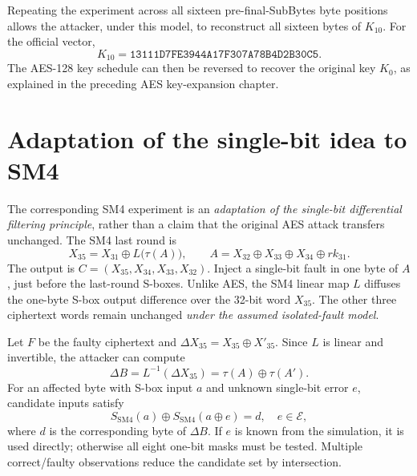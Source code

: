 \documentclass[11pt,a4paper]{report}
\newcommand{\hex}[1]{\texttt{#1}}
\newcommand{\xor}{\mathbin{\oplus}}
\begin{document}
Repeating the experiment across all sixteen pre-final-SubBytes byte positions allows the attacker, under this model, to reconstruct all sixteen bytes of $K_{10}$. For the official vector,
\begin{equation}
K_{10}=\hex{13111D7FE3944A17F307A78B4D2B30C5}.
\end{equation}
The AES-128 key schedule can then be reversed to recover the original key $K_0$, as explained in the preceding AES key-expansion chapter.

\section{Adaptation of the single-bit idea to SM4}
\label{sec:giraud_sm4}
The corresponding SM4 experiment is an \emph{adaptation of the single-bit differential filtering principle}, rather than a claim that the original AES attack transfers unchanged. The SM4 last round is
\begin{equation}
X_{35}=X_{31}\xor L\bigl(\tau(A)\bigr),\qquad A=X_{32}\xor X_{33}\xor X_{34}\xor rk_{31}.
\end{equation}
The output is $C=(X_{35},X_{34},X_{33},X_{32})$. Inject a single-bit fault in one byte of $A$, just before the last-round S-boxes. Unlike AES, the SM4 linear map $L$ diffuses the one-byte S-box output difference over the 32-bit word $X_{35}$. The other three ciphertext words remain unchanged \emph{under the assumed isolated-fault model}.

Let $F$ be the faulty ciphertext and $\Delta X_{35}=X_{35}\xor X'_{35}$. Since $L$ is linear and invertible, the attacker can compute
\begin{equation}
\Delta B=L^{-1}(\Delta X_{35})=\tau(A)\xor\tau(A').
\end{equation}
For an affected byte with S-box input $a$ and unknown single-bit error $e$, candidate inputs satisfy
\begin{equation}
S_{\mathrm{SM4}}(a)\xor S_{\mathrm{SM4}}(a\xor e)=d,
\quad e\in\mathcal E,
\end{equation}
where $d$ is the corresponding byte of $\Delta B$. If $e$ is known from the simulation, it is used directly; otherwise all eight one-bit masks must be tested. Multiple correct/faulty observations reduce the candidate set by intersection.
\end{document}
